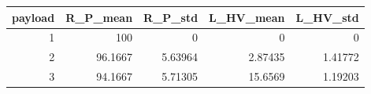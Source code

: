 \begin{tabular}{rrrrr}
\toprule
payload & R\_P\_mean & R\_P\_std & L\_HV\_mean & L\_HV\_std \\
\midrule
1 & 100 & 0 & 0 & 0 \\
2 & 96.1667 & 5.63964 & 2.87435 & 1.41772 \\
3 & 94.1667 & 5.71305 & 15.6569 & 1.19203 \\
\bottomrule
\end{tabular}
